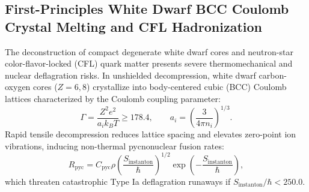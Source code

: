 \documentclass[11pt,onecolumn]{article}
\begin{document}
\subsection{First-Principles White Dwarf BCC Coulomb Crystal Melting and CFL Hadronization}
\label{subsec:wd_coulomb_cfl_hadronize}
The deconstruction of compact degenerate white dwarf cores and neutron-star color-flavor-locked (CFL) quark matter presents severe thermomechanical and nuclear deflagration risks. In unshielded decompression, white dwarf carbon-oxygen cores ($Z=6, 8$) crystallize into body-centered cubic (BCC) Coulomb lattices characterized by the Coulomb coupling parameter:
\begin{equation}
\Gamma = \frac{Z^2 e^2}{a_i k_B T} \ge 178.4, \qquad a_i = \left(\frac{3}{4\pi n_i}\right)^{1/3}.
\label{eq:coulomb_gamma_bcc}
\end{equation}
Rapid tensile decompression reduces lattice spacing and elevates zero-point ion vibrations, inducing non-thermal pycnonuclear fusion rates:
\begin{equation}
R_{\text{pyc}} = C_{\text{pyc}} \rho \left(\frac{S_{\text{instanton}}}{\hbar}\right)^{1/2} \exp\left(-\frac{S_{\text{instanton}}}{\hbar}\right),
\label{eq:pycnonuclear_rate_wkb}
\end{equation}
which threaten catastrophic Type Ia deflagration runaways if $S_{\text{instanton}} / \hbar < 250.0$.
\end{document}
